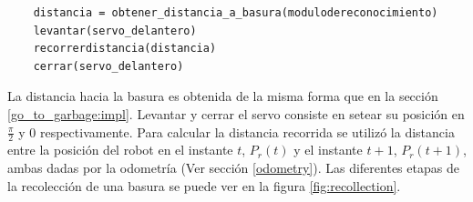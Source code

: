 \begin{verbatim}
    distancia = obtener_distancia_a_basura(modulodereconocimiento)
    levantar(servo_delantero)
    recorrerdistancia(distancia)
    cerrar(servo_delantero)
\end{verbatim}

La distancia hacia la basura es obtenida de la misma forma que en la secci\'on
\ref{go_to_garbage:impl}. Levantar y cerrar el servo consiste en setear su
posici\'on en $\frac{\pi}{2}$ y $0$ respectivamente. Para calcular la distancia
recorrida se utiliz\'o la distancia entre la posici\'on del robot en el instante $t$,
$P_r(t)$ y el instante $t+1$, $P_r(t+1)$, ambas dadas por la odometr\'ia
(Ver secci\'on \ref{odometry}). Las diferentes etapas de la recolecci\'on de una
basura se puede ver en la figura \ref{fig:recollection}.

